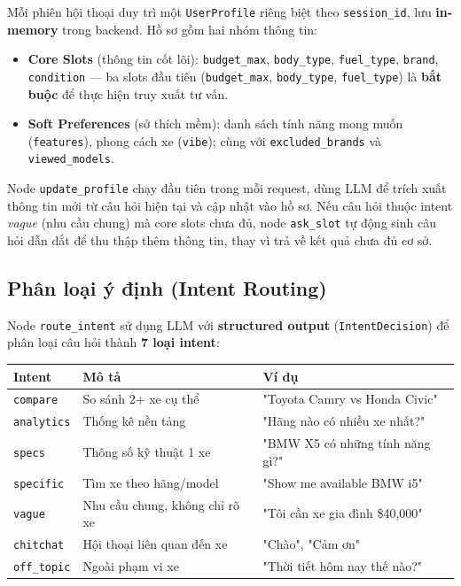 Mỗi phiên hội thoại duy trì một \texttt{UserProfile} riêng biệt theo \texttt{session\_id}, lưu \textbf{in-memory} trong backend. Hồ sơ gồm hai nhóm thông tin:

\begin{itemize}
    \item \textbf{Core Slots} (thông tin cốt lõi): \texttt{budget\_max}, \texttt{body\_type}, \texttt{fuel\_type}, \texttt{brand}, \texttt{condition} — ba slots đầu tiên (\texttt{budget\_max}, \texttt{body\_type}, \texttt{fuel\_type}) là \textbf{bắt buộc} để thực hiện truy xuất tư vấn.
    \item \textbf{Soft Preferences} (sở thích mềm): danh sách tính năng mong muốn (\texttt{features}), phong cách xe (\texttt{vibe}); cùng với \texttt{excluded\_brands} và \texttt{viewed\_models}.
\end{itemize}

Node \texttt{update\_profile} chạy đầu tiên trong mỗi request, dùng LLM để trích xuất thông tin mới từ câu hỏi hiện tại và cập nhật vào hồ sơ. Nếu câu hỏi thuộc intent \textit{vague} (nhu cầu chung) mà core slots chưa đủ, node \texttt{ask\_slot} tự động sinh câu hỏi dẫn dắt để thu thập thêm thông tin, thay vì trả về kết quả chưa đủ cơ sở.

\subsection{Phân loại ý định (Intent Routing)}

Node \texttt{route\_intent} sử dụng LLM với \textbf{structured output} (\texttt{IntentDecision}) để phân loại câu hỏi thành \textbf{7 loại intent}:

\begin{center}
\small
\begin{tabular}{|l|l|l|}
\hline
\textbf{Intent} & \textbf{Mô tả} & \textbf{Ví dụ} \\
\hline
\texttt{compare} & So sánh 2+ xe cụ thể & "Toyota Camry vs Honda Civic" \\
\hline
\texttt{analytics} & Thống kê nền tảng & "Hãng nào có nhiều xe nhất?" \\
\hline
\texttt{specs} & Thông số kỹ thuật 1 xe & "BMW X5 có những tính năng gì?" \\
\hline
\texttt{specific} & Tìm xe theo hãng/model & "Show me available BMW i5" \\
\hline
\texttt{vague} & Nhu cầu chung, không chỉ rõ xe & "Tôi cần xe gia đình \$40,000" \\
\hline
\texttt{chitchat} & Hội thoại liên quan đến xe & "Chào", "Cảm ơn" \\
\hline
\texttt{off\_topic} & Ngoài phạm vi xe & "Thời tiết hôm nay thế nào?" \\
\hline
\end{tabular}
\end{center}

